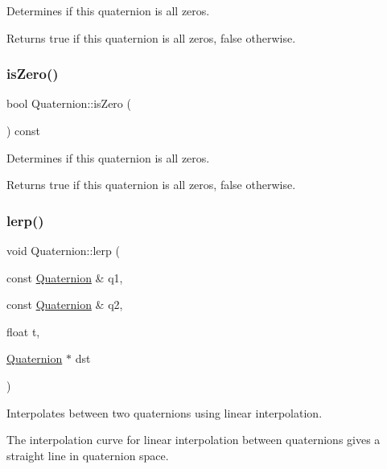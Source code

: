 Determines if this quaternion is all zeros.

\begin{DoxyReturn}{Returns}
true if this quaternion is all zeros, false otherwise. 
\end{DoxyReturn}
\mbox{\label{classQuaternion_ab355dcc6194b9dcf4f303a1afec9f0b2}} 
\subsubsection{\texorpdfstring{is\+Zero()}{isZero()}\hspace{0.1cm}{\footnotesize\ttfamily [2/2]}}
{\footnotesize\ttfamily bool Quaternion\+::is\+Zero (\begin{DoxyParamCaption}{ }\end{DoxyParamCaption}) const}

Determines if this quaternion is all zeros.

\begin{DoxyReturn}{Returns}
true if this quaternion is all zeros, false otherwise. 
\end{DoxyReturn}
\mbox{\label{classQuaternion_a368f2a3510b1c20dfe0b9ab3fc10a1e7}} 
\subsubsection{\texorpdfstring{lerp()}{lerp()}\hspace{0.1cm}{\footnotesize\ttfamily [1/2]}}
{\footnotesize\ttfamily void Quaternion\+::lerp (\begin{DoxyParamCaption}\item[{const \hyperlink{classQuaternion}{Quaternion} \&}]{q1,  }\item[{const \hyperlink{classQuaternion}{Quaternion} \&}]{q2,  }\item[{float}]{t,  }\item[{\hyperlink{classQuaternion}{Quaternion} $\ast$}]{dst }\end{DoxyParamCaption})\hspace{0.3cm}{\ttfamily [static]}}

Interpolates between two quaternions using linear interpolation.

The interpolation curve for linear interpolation between quaternions gives a straight line in quaternion space.



